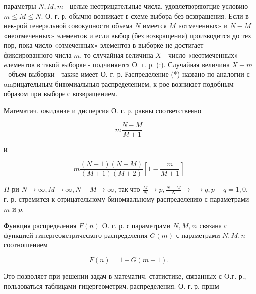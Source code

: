 \documentclass[10pt]{article}
\begin{document}
параметры $N, M, m$ - целые неотрицательные числа, удовлетворяюгцие условию $m \leqslant M \leqslant N$. О. г. р. обычно возникает в схеме выбора без возвращения. Если в нек-рой генеральной совокупности объема $N$ имеется $M$ «отмеченных» и $N-M$ «неотмеченных» элементов и если выбор (без возвращения) производится до тех пор, пока число «отмеченных» элементов в выборке не достигает фиксированного числа $m$, то случайная величина $X$ - число «неотмеченных» әлементов в такой выборке - подчиняется О. г. р. (:). Случайная величина $X+m$ - объем выборки - также имеет О. г. р. Распределение (*) названо по аналогии с omрицательным биномиальныл распределением, к-рое возникает подобным образом при выборе с возвращением.



Математич. ожидание и дисперсия О. г. р. равны соответственно



\[

m \frac{N-M}{M+1}

\]



и



\[

m \frac{(N+1)(N-M)}{(M+1)(M+2)}\left[1-\frac{m}{M+1}\right]

\]



$\Pi$ ри $N \rightarrow \infty, M \rightarrow \infty, N-M \rightarrow \infty$, так что $\frac{M}{N} \rightarrow p, \frac{N-M}{N} \rightarrow$ $\rightarrow q, p+q=1,0$. г. р. стремится к отрицательному биномиальному распределению с параметрами $m$ и $p$.



Функция распределения $F(n)$ O. г. р. с параметрами $N, M, m$ связана с функцией гипергеометрического распределения $G(m)$ с параметрами $N, M, n$ соотношением



\[

F(n)=1-G(m-1) .

\]



Это позволяет при решении задач в математич. статистике, связанных с O.г. р., пользоваться таблицами гицергеометрич. распределения. О. г. р. пршм-
\end{document}
